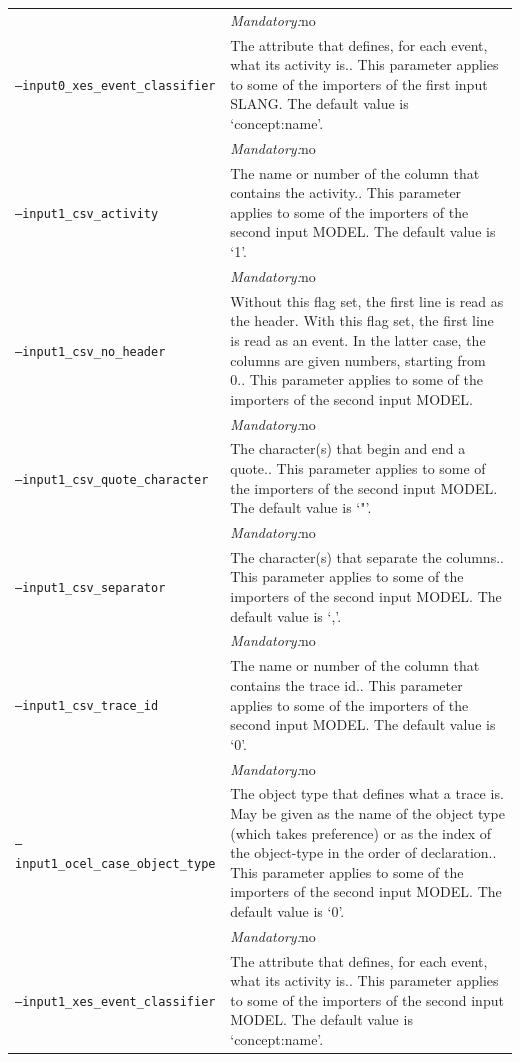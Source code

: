 {\begin{tabularx}{\linewidth}{lX}
&\textit{Mandatory:}\quad no\\
\texttt{--input0\_xes\_event\_classifier} & The attribute that defines, for each event, what its activity is.. This parameter applies to some of the importers of the first input SLANG. The default value is `concept:name'.\\
&\textit{Mandatory:}\quad no\\
\texttt{--input1\_csv\_activity} & The name or number of the column that contains the activity.. This parameter applies to some of the importers of the second input MODEL. The default value is `1'.\\
&\textit{Mandatory:}\quad no\\
\texttt{--input1\_csv\_no\_header} & Without this flag set, the first line is read as the header. 
    With this flag set, the first line is read as an event. In the latter case, the columns are given numbers, starting from 0.. This parameter applies to some of the importers of the second input MODEL. \\
&\textit{Mandatory:}\quad no\\
\texttt{--input1\_csv\_quote\_character} & The character(s) that begin and end a quote.. This parameter applies to some of the importers of the second input MODEL. The default value is `"'.\\
&\textit{Mandatory:}\quad no\\
\texttt{--input1\_csv\_separator} & The character(s) that separate the columns.. This parameter applies to some of the importers of the second input MODEL. The default value is `,'.\\
&\textit{Mandatory:}\quad no\\
\texttt{--input1\_csv\_trace\_id} & The name or number of the column that contains the trace id.. This parameter applies to some of the importers of the second input MODEL. The default value is `0'.\\
&\textit{Mandatory:}\quad no\\
\texttt{--input1\_ocel\_case\_object\_type} & The object type that defines what a trace is. May be given as the name of the object type (which takes preference) or as the index of the object-type in the order of declaration.. This parameter applies to some of the importers of the second input MODEL. The default value is `0'.\\
&\textit{Mandatory:}\quad no\\
\texttt{--input1\_xes\_event\_classifier} & The attribute that defines, for each event, what its activity is.. This parameter applies to some of the importers of the second input MODEL. The default value is `concept:name'.\\

\end{tabularx}}
